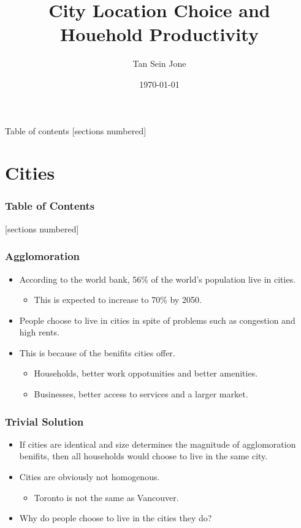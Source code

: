 \documentclass[serif, 9pt, aspectratio=32]{beamer}
\title{City Location Choice and Houehold Productivity}
\date{\today}
\author{Tan Sein Jone}
\institute{University of British Columbia}
\begin{document}
\maketitle

\begin{frame}{Table of contents}
    [sections numbered]
    \tableofcontents[hideallsubsections]
\end{frame}

\section{Cities}

\begin{frame}
    \frametitle{Table of Contents}
    [sections numbered]
    \tableofcontents[currentsection]
\end{frame}

\begin{frame}
    \centering
    \frametitle{Agglomoration}
    \begin{itemize}
        \setlength{\itemsep}{3em}
        \item According to the world bank, 56\% of the world's population live in cities.
              \begin{itemize}
                  \setlength{\itemsep}{1em}
                  \item This is expected to increase to 70\% by 2050.
              \end{itemize}
        \item People choose to live in cities in spite of problems such as congestion and high rents.
        \item This is because of the benifits cities offer.
              \begin{itemize}
                  \setlength{\itemsep}{1em}
                  \item Households, better work oppotunities and better amenities.
                  \item Businesses, better access to services and a larger market.
              \end{itemize}
    \end{itemize}
\end{frame}

\begin{frame}
    \centering
    \frametitle{Trivial Solution}
    \begin{itemize}
        \setlength{\itemsep}{3em}
        \item If cities are identical and size determines the magnitude of agglomoration benifits, then all households would choose to live in the same city.
        \item Cities are obviously not homogenous.
              \begin{itemize}
                  \item Toronto is not the same as Vancouver.
              \end{itemize}
        \item Why do people choose to live in the cities they do?
    \end{itemize}
\end{frame}
\end{document}
